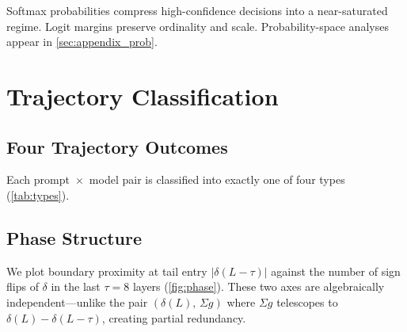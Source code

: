 \documentclass{article}
\begin{document}
Softmax probabilities compress high-confidence decisions into a near-saturated regime.  Logit margins preserve ordinality and scale.  Probability-space analyses appear in \cref{sec:appendix_prob}.


\section{Trajectory Classification}
\label{sec:phase}

\subsection{Four Trajectory Outcomes}

Each prompt~$\times$~model pair is classified into exactly one of four types (\cref{tab:types}).

\begin{table}[t]
  \caption{The four trajectory types.}
  \label{tab:types}
  \vskip 0.1in
  \begin{center}
  \begin{small}
  \end{small}
  \end{center}
\end{table}

\subsection{Phase Structure}

We plot boundary proximity at tail entry $|\delta(L{-}\tau)|$ against the number of sign flips of $\delta$ in the last $\tau = 8$ layers (\cref{fig:phase}).  These two axes are algebraically independent---unlike the pair $(\delta(L),\, \Sigma g)$ where $\Sigma g$ telescopes to $\delta(L) - \delta(L{-}\tau)$, creating partial redundancy.
\end{document}

